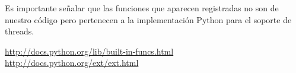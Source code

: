 \documentclass[10pt,a4paper]{article}
\begin{document}
Es importante señalar que las funciones que aparecen registradas no son de nuestro código pero pertenecen a la implementación Python para el soporte de threads.


\newpage
\begin{thebibliography}{2}
 \url{http://docs.python.org/lib/built-in-funcs.html}
 \url{http://docs.python.org/ext/ext.html}
\end{thebibliography}
\end{document}
